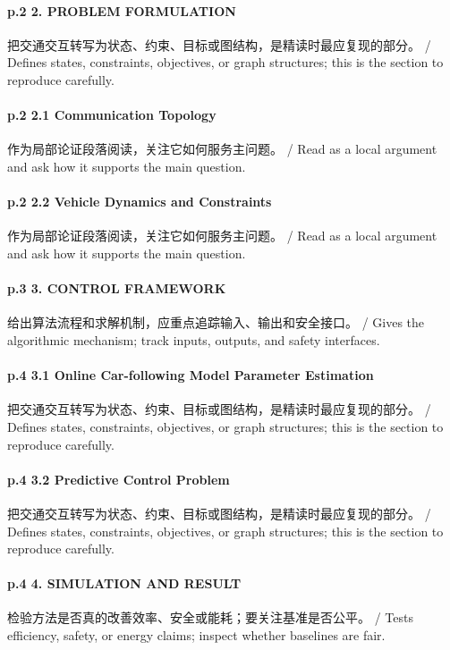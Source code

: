 \documentclass[UTF8,a4paper,11pt,fontset=fandol]{ctexart}
\begin{document}
\paragraph{p.2 2. PROBLEM FORMULATION}把交通交互转写为状态、约束、目标或图结构，是精读时最应复现的部分。 / Defines states, constraints, objectives, or graph structures; this is the section to reproduce carefully.

\paragraph{p.2 2.1 Communication Topology}作为局部论证段落阅读，关注它如何服务主问题。 / Read as a local argument and ask how it supports the main question.

\paragraph{p.2 2.2 Vehicle Dynamics and Constraints}作为局部论证段落阅读，关注它如何服务主问题。 / Read as a local argument and ask how it supports the main question.

\paragraph{p.3 3. CONTROL FRAMEWORK}给出算法流程和求解机制，应重点追踪输入、输出和安全接口。 / Gives the algorithmic mechanism; track inputs, outputs, and safety interfaces.

\paragraph{p.4 3.1 Online Car-following Model Parameter Estimation}把交通交互转写为状态、约束、目标或图结构，是精读时最应复现的部分。 / Defines states, constraints, objectives, or graph structures; this is the section to reproduce carefully.

\paragraph{p.4 3.2 Predictive Control Problem}把交通交互转写为状态、约束、目标或图结构，是精读时最应复现的部分。 / Defines states, constraints, objectives, or graph structures; this is the section to reproduce carefully.

\paragraph{p.4 4. SIMULATION AND RESULT}检验方法是否真的改善效率、安全或能耗；要关注基准是否公平。 / Tests efficiency, safety, or energy claims; inspect whether baselines are fair.
\end{document}
